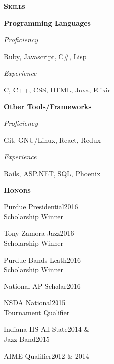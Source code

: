 \documentclass[11pt]{article}
\newcommand{\sectionfont}{\Large\scshape\bfseries\color{cg505green}}
\begin{document}
\begin{minipage}[t]{0.3\textwidth}
  \vspace{5pt}

  {\sectionfont Skills}

  \textbf{Programming Languages}
  \begin{adjustwidth}{10pt}{}
    \emph{Proficiency}

    \quad Ruby, Javascript, C\#, Lisp

    \emph{Experience}

    \quad C, C++, CSS, HTML, Java, Elixir
  \end{adjustwidth}

  \textbf{Other Tools/Frameworks}
  \begin{adjustwidth}{10pt}{}
    \emph{Proficiency}

    \quad Git, GNU/Linux, React, Redux

    \emph{Experience}

    \quad Rails, ASP.NET, SQL, Phoenix
  \end{adjustwidth}

  \vspace{5pt}

  {\sectionfont Honors}
  \begin{adjustwidth}{10pt}{}
    Purdue Presidential\hfill 2016\\
    Scholarship Winner

    Tony Zamora Jazz\hfill 2016\\
    Scholarship Winner

    Purdue Bands Leath\hfill 2016\\
    Scholarship Winner

    National AP Scholar\hfill 2016

    NSDA National\hfill 2015\\
    Tournament Qualifier

    Indiana HS All-State\hfill 2014 \&\\
    Jazz Band\hfill 2015

    AIME Qualifier\hfill 2012 \& 2014
  \end{adjustwidth}
\end{minipage}
\hfill\vrule\hfill{}
\end{document}
